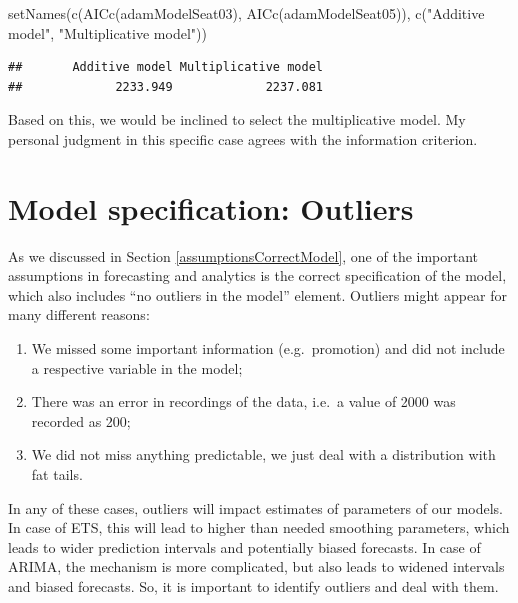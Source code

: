 \documentclass[
]{book}
\newenvironment{Shaded}{\begin{snugshade}}{\end{snugshade}}
\newcommand{\FunctionTok}[1]{\textcolor[rgb]{0.00,0.00,0.00}{#1}}
\newcommand{\NormalTok}[1]{#1}
\newcommand{\StringTok}[1]{\textcolor[rgb]{0.31,0.60,0.02}{#1}}
\providecommand{\tightlist}{%
  \setlength{\itemsep}{0pt}\setlength{\parskip}{0pt}}
\theoremstyle{definition}
\theoremstyle{definition}
\theoremstyle{definition}
\theoremstyle{definition}
\theoremstyle{remark}
\begin{document}
\begin{Shaded}
\begin{Highlighting}[]
\FunctionTok{setNames}\NormalTok{(}\FunctionTok{c}\NormalTok{(}\FunctionTok{AICc}\NormalTok{(adamModelSeat03), }\FunctionTok{AICc}\NormalTok{(adamModelSeat05)),}
         \FunctionTok{c}\NormalTok{(}\StringTok{"Additive model"}\NormalTok{, }\StringTok{"Multiplicative model"}\NormalTok{))}
\end{Highlighting}
\end{Shaded}

\begin{verbatim}
##       Additive model Multiplicative model 
##             2233.949             2237.081
\end{verbatim}

Based on this, we would be inclined to select the multiplicative model. My personal judgment in this specific case agrees with the information criterion.

\hypertarget{diagnosticsOutliers}{%
\section{Model specification: Outliers}\label{diagnosticsOutliers}}

As we discussed in Section \ref{assumptionsCorrectModel}, one of the important assumptions in forecasting and analytics is the correct specification of the model, which also includes ``no outliers in the model'' element. Outliers might appear for many different reasons:

\begin{enumerate}
\def\labelenumi{\arabic{enumi}.}
\tightlist
\item
  We missed some important information (e.g.~promotion) and did not include a respective variable in the model;
\item
  There was an error in recordings of the data, i.e.~a value of 2000 was recorded as 200;
\item
  We did not miss anything predictable, we just deal with a distribution with fat tails.
\end{enumerate}

In any of these cases, outliers will impact estimates of parameters of our models. In case of ETS, this will lead to higher than needed smoothing parameters, which leads to wider prediction intervals and potentially biased forecasts. In case of ARIMA, the mechanism is more complicated, but also leads to widened intervals and biased forecasts. So, it is important to identify outliers and deal with them.
\end{document}
